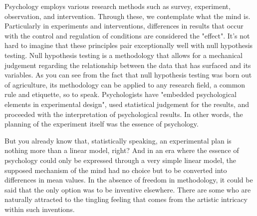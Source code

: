 \documentclass{ltjsbook}
\begin{document}
Psychology employs various research methods such as survey, experiment, observation, and intervention. Through these, we contemplate what the mind is. Particularly in experiments and interventions, differences in results that occur with the control and regulation of conditions are considered the "effect". It's not hard to imagine that these principles pair exceptionally well with null hypothesis testing. Null hypothesis testing is a methodology that allows for a mechanical judgement regarding the relationship between the data that has surfaced and its variables. As you can see from the fact that null hypothesis testing was born out of agriculture, its methodology can be applied to any research field, a common rule and etiquette, so to speak. Psychologists have "embedded psychological elements in experimental design", used statistical judgement for the results, and proceeded with the interpretation of psychological results. In other words, the planning of the experiment itself was the essence of psychology.

But you already know that, statistically speaking, an experimental plan is nothing more than a linear model, right? And in an era where the essence of psychology could only be expressed through a very simple linear model, the supposed mechanism of the mind had no choice but to be converted into differences in mean values. In the absence of freedom in methodology, it could be said that the only option was to be inventive elsewhere. There are some who are naturally attracted to the tingling feeling that comes from the artistic intricacy within such inventions.
\end{document}
